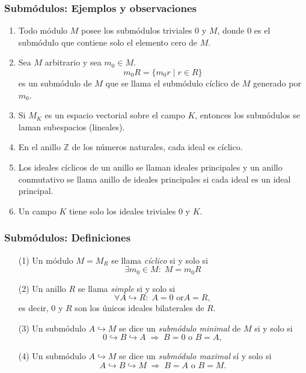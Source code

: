 \documentclass[notes=show]{beamer}%
\begin{document}
\begin{frame}
    \frametitle{Submódulos: Ejemplos y observaciones}
    \begin{enumerate}
        \item Todo módulo \( M \) posee los submódulos triviales \( 0 \) y \( M \), donde \( 0 \) es el submódulo 
        que contiene solo el elemento cero de \( M \).
        \item Sea \( M \) arbitrario y sea \( m_0 \in M \).
        \[
        m_0R = \{m_0r \mid r \in R\}
        \]
        es un submódulo de \( M \) que se llama el submódulo cíclico de \( M \) generado por \( m_0 \).
        \item Si \( M_K \) es un espacio vectorial sobre el campo \( K \), entonces los submódulos se 
        laman subespacios (lineales).
        \item En el anillo \( \mathbb{Z} \) de los números naturales, cada ideal es cíclico.
        \item Los ideales cíclicos de un anillo se llaman ideales principales y un anillo conmutativo se 
        llama anillo de ideales principales si cada ideal es un ideal principal.
        \item Un campo \( K \) tiene solo los ideales triviales \( 0 \) y \( K \).
    \end{enumerate}
\end{frame}

\begin{frame}
    \frametitle{Submódulos: Definiciones}
    \begin{enumerate}
        \item[(1)] Un módulo \( M = M_R \) se llama \textit{cíclico} si y solo si
        \[ \exists m_0 \in M : \; M = m_0R \]
        \item[(2)] Un anillo \( R \) se llama \textit{simple} si y solo si
        \[
        \forall A \hookrightarrow R: \; A = 0 \text{ or} A = R,
        \]
        es decir, \( 0 \) y \( R \) son los únicos ideales bilaterales de \( R \).
        \item[(3)] Un submódulo \( A \hookrightarrow M \) se dice un \textit{submódulo minimal} de \( M \) si y solo si
        \[
        0 \hookrightarrow B \hookrightarrow A \;\Rightarrow\; B = 0 \text{ o } B = A,
        \]
        \item[(4)] Un submódulo \( A \hookrightarrow M \) se dice un \textit{submódulo maximal} sí y solo si
     \[
            A \hookrightarrow B \hookrightarrow M \;\Rightarrow\; B = A \text{ o } B = M.
            \]
    \end{enumerate}
\end{frame}
\end{document}
